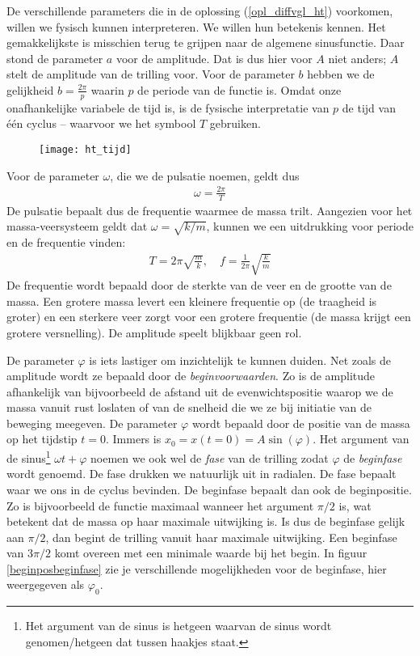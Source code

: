 De verschillende parameters die in de oplossing (\ref{opl_diffvgl_ht}) voorkomen, willen we fysisch kunnen interpreteren. We willen hun betekenis kennen. Het gemakkelijkste is misschien terug te grijpen naar de algemene sinusfunctie. Daar stond de parameter $a$ voor de amplitude. Dat is dus hier voor $A$ niet anders; $A$ stelt de amplitude van de trilling voor. Voor de parameter $b$ hebben we de gelijkheid $b=\frac{2\pi}{p}$ waarin $p$ de periode van de functie is. Omdat onze onafhankelijke variabele de tijd is, is de fysische interpretatie van $p$ de tijd van \'e\'en cyclus -- waarvoor we het symbool $T$ gebruiken. 
\begin{figure}[h]
\centering
\texttt{[image: ht\_tijd]}
\end{figure}
Voor de parameter $\omega$, die we de pulsatie noemen, geldt dus
\begin{eqnarray*}
\omega=\frac{2\pi}{T}
\end{eqnarray*}
De pulsatie bepaalt dus de frequentie waarmee de massa trilt. Aangezien voor het massa-veersysteem geldt dat $\omega=\sqrt{k/m}$, kunnen we een uitdrukking voor periode en de frequentie vinden:
\begin{eqnarray*}
T=2\pi\sqrt{\frac{m}{k}},\quad f=\frac{1}{2\pi}\sqrt{\frac{k}{m}}
\end{eqnarray*}
De frequentie wordt bepaald door de sterkte van de veer en de grootte van de massa. Een grotere massa levert een kleinere frequentie op (de traagheid is groter) en een sterkere veer zorgt voor een grotere frequentie (de massa krijgt een grotere versnelling). De amplitude speelt blijkbaar geen rol.

De parameter $\varphi$ is iets lastiger om inzichtelijk te kunnen duiden. Net zoals de amplitude wordt ze bepaald door de \emph{beginvoorwaarden}. Zo is de amplitude afhankelijk van bijvoorbeeld de afstand uit de evenwichtspositie waarop we de massa vanuit rust loslaten of van de snelheid die we ze bij initiatie van de beweging meegeven. De parameter $\varphi$ wordt bepaald door de positie van de massa op het tijdstip $t=0$. Immers is $x_0=x(t=0)=A\sin(\varphi)$. Het argument van de sinus\footnote{Het argument van de sinus is hetgeen waarvan de sinus wordt genomen/hetgeen dat tussen haakjes staat.} $\omega t+\varphi$ noemen we ook wel de \emph{fase} van de trilling zodat $\varphi$ de \emph{beginfase} wordt genoemd. De fase drukken we natuurlijk uit in radialen. De fase bepaalt waar we ons in de cyclus bevinden. 
De beginfase bepaalt dan ook de beginpositie. Zo is bijvoorbeeld de functie maximaal wanneer het argument $\pi/2$ is, wat betekent dat de massa op haar maximale uitwijking is. Is dus de beginfase gelijk aan $\pi/2$, dan begint de trilling vanuit haar maximale uitwijking. Een beginfase van $3\pi/2$ komt overeen met een minimale waarde bij het begin. In figuur \ref{beginposbeginfase} zie je verschillende mogelijkheden voor de beginfase, hier weergegeven als $\varphi_0$.

